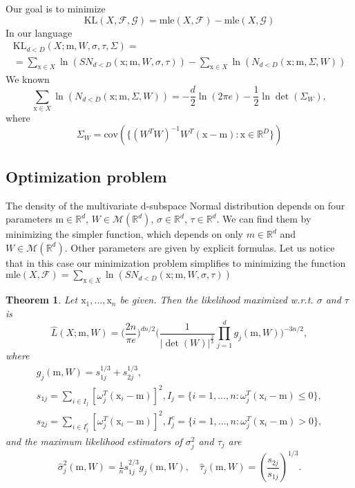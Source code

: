 \documentclass[12pt]{article}
\def\R{\mathbb{R}}
\def\w{\omega}
\def\x{\mathrm{x}}
\def\m{\mathrm{m}}
\def\F{\mathcal{F}}
\def\G{\mathcal{G}}
\def\M{\mathcal{M}}
\def\KL{\mathrm{KL}}
\def\mle{\mathrm{mle}}
\def\cov{\mathrm{cov}}
\newtheorem{theorem}{Theorem}[section]
\theoremstyle{definition}
\def\w{\omega}
\begin{document}
Our goal is to minimize
$$
\KL(X,\F,\G)=\mle(X,\F)-\mle(X,\G) 
$$
In our language
\begin{equation}
\begin{array}{l}
\KL_{d<D}(X;\m,W,\sigma,\tau,\Sigma) = \\[6pt]
= \sum \limits_{\x \in X} \ln(SN_{d<D}(\x;\m,W,\sigma,\tau)) -
   \sum \limits_{\x \in X} \ln(N_{d<D}(\x;\m,\Sigma,W))
\end{array}
\end{equation}
We known
$$
\sum \limits_{\x \in X} \ln(N_{d<D}(\x;\m,\Sigma,W)) = -\frac{d}{2}\ln(2\pi e)-\frac{1}{2}\ln \det(\Sigma_{W}), 
$$
where 
$$
\Sigma_{W} = \cov( \{ (W^TW)^{-1}W^T(\x-\m) \colon \x \in \R^D\} )
$$

\subsection{Optimization problem}

The density of the multivariate d-subspace Normal distribution depends on four parameters $\m \in \R^d$, $W \in \M(\R^d)$, $\sigma \in \R^d$, $\tau \in \R^d$. 
We can find them by minimizing the simpler function, which depends on only  $m \in \R^d$ and $W \in \M(\R^d)$. Other parameters are given by explicit formulas. Let us notice that in this case our minimization problem simplifies to minimizing the function $\mle(X,\F) = \sum \limits_{\x \in X} \ln(SN_{d<D}(\x;\m,W,\sigma,\tau))$

\begin{theorem}\label{the:min}
Let $\x_1,\ldots,\x_n$ be given.  
Then the likelihood maximized w.r.t. $\sigma$ and $\tau$ is
\begin{equation}\label{eq:1}
 \hat{L}(X;\m,W) =   \bigg( \frac{2n}{\pi e} \bigg)^{dn/2} \bigg( \frac{1}{|\det(W)|^{\frac{2}{3}}} \prod_{j=1}^{d} g_{j}(\m,W) \bigg)^{-3n/2},
\end{equation}
where
$$
\begin{array}{c}
{g}_{j}(\m,W) = {s}_{1j}^{1/3} + {s}_{2j}^{1/3},
\\[1ex]
{s}_{1j}= \! \sum\limits_{i \in I_j}[ \w_{j}^T (\x_i-\m)]^2,  {I}_j=\{ i = 1,\ldots,n \colon \w_{j}^T (\x_i-\m) \leq 0 \},
\\[1ex]
{s}_{2j}= \! \sum\limits_{i \in I_j^c}[ \w_{j}^T (\x_i-\m)]^2, {I}_j^c=\{ i = 1,\ldots,n \colon  \w_{j}^T (\x_i-\m) > 0 \},
\end{array}
$$
and the maximum likelihood estimators of $\sigma_{j}^2$ and $\tau_{j}$ are
$$\hat \sigma_j^2(\m,W) = \tfrac{1}{n} s_{1j}^{2/3} g_{j}(\m,W), \quad
\hat \tau_{j}(\m,W)=\left(\frac{s_{2j}}{s_{1j}}\right)^{1/3}.
$$
\end{theorem}
\end{document}
